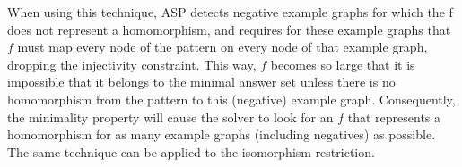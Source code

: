 When using this technique, ASP detects negative example graphs for which the f does not represent a homomorphism, and 
requires for these example graphs that $f$ must map every node of the pattern on every node of that example graph, dropping the injectivity constraint.
This way, $f$ becomes so large that it is impossible that it belongs to the minimal answer set unless there is no homomorphism from the pattern to this (negative) example graph.
Consequently, the minimality property will cause the solver to look for an $f$ that represents a homomorphism for as many example graphs (including negatives) as possible.
The same technique can be applied to the isomorphism restriction.


